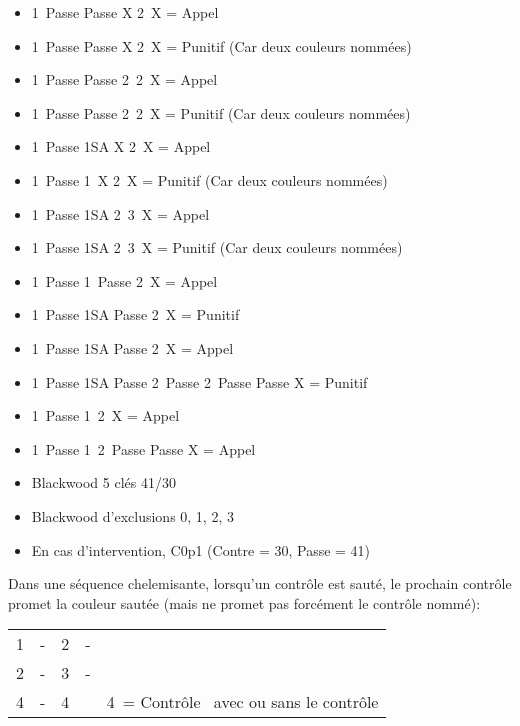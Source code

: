 \documentclass[a4paper, oneside, 11pt]{report}
\begin{document}
\begin{itemize}
	\item 1\pique\ Passe Passe X 2\pique\ X = Appel
	\item 1\pique\ Passe Passe X 2\carreau\ X = Punitif (Car deux couleurs nommées)
	\item 1\pique\ Passe Passe 2\trefle\ 2\pique\ X = Appel
	\item 1\pique\ Passe Passe 2\trefle\ 2\carreau\ X = Punitif (Car deux couleurs nommées)
	\item 1\carreau\ Passe 1SA X 2\carreau\ X = Appel
	\item 1\carreau\ Passe 1\coeur\ X 2\carreau\ X = Punitif (Car deux couleurs nommées)
	\item 1\carreau\ Passe 1SA 2\pique\ 3\carreau\ X = Appel
	\item 1\carreau\ Passe 1SA 2\pique\ 3\trefle\ X = Punitif (Car deux couleurs nommées)\\

	\item 1\coeur\ Passe 1\pique\ Passe 2\coeur\ X = Appel
	\item 1\coeur\ Passe 1SA Passe 2\coeur\ X = Punitif
	\item 1\coeur\ Passe 1SA Passe 2\trefle\ X  = Appel
	\item 1\coeur\ Passe 1SA Passe 2\trefle\ Passe 2\coeur\ Passe Passe X  = Punitif\\

	\item 1\carreau\ Passe 1\coeur\ 2\coeur\ X = Appel
	\item 1\carreau\ Passe 1\coeur\ 2\coeur\ Passe Passe X = Appel\\
	\end{itemize}

	\begin{itemize}
	\item Blackwood 5 clés 41/30
	\item Blackwood d'exclusions 0, 1, 2, 3
	\item En cas d'intervention,  C0p1 (Contre = 30,  Passe = 41)\\
	\end{itemize}

	Dans une séquence chelemisante,  lorsqu'un contrôle est sauté,  le prochain contrôle promet la couleur sautée (mais ne promet pas forcément le contrôle nommé):\\
	\begin{tabular}{cccc|l}
	1\pique & -  & 2\trefle & - &\\
	2\pique & - & 3\pique & - &\\
	4\carreau & - & 4\coeur && 4\coeur\ = Contrôle \trefle\ avec ou sans le contrôle \coeur\\
	\end{tabular}\\\\
\end{document}
